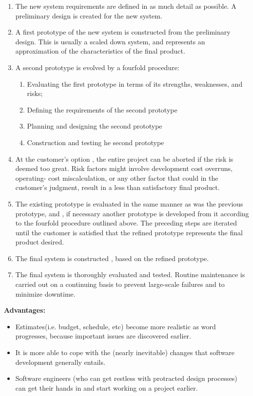 \begin{enumerate}
 \item The new system requirements are defined in as much detail as possible. A preliminary design is created for the new system. 
 \item A first prototype of the new system is constructed from the preliminary design. This is usually a scaled down system, 
and represents an approximation of the characteristics of the final product. 
 \item A second prototype is evolved by a fourfold procedure:
 \begin{enumerate}
  \item Evaluating the first prototype in terms of its strengths, weaknesses, and risks;
  \item Defining the requirements of the second prototype
  \item Planning and designing the second prototype 
  \item Construction and testing he second prototype 
 \end{enumerate}
 \item At the customer's option , the entire project can be aborted if the risk is deemed too great. Risk factors might 
involve development cost overruns, operating- cost miscalculation, or any other factor that could in the customer's judgment, 
result in a less than satisfactory final product.
 \item The existing prototype is evaluated in the same manner as was the previous prototype, and , if necessary another prototype 
is developed from it according to the fourfold procedure outlined above. The preceding steps are iterated until the customer is 
satisfied that the refined prototype represents the final product desired. 
 \item The final system is constructed , based on the refined prototype. 
 \item The final system is thoroughly evaluated and tested. Routine maintenance is carried out on a continuing basis to prevent 
large-scale failures and to minimize downtime.
\end{enumerate}
\textbf{Advantages:}
\begin{itemize}
 \item Estimates(i.e. budget, schedule, etc) become more realistic as word progresses, because important issues are discovered earlier. 
 \item It is more able to cope with the (nearly inevitable) changes that software development generally entails. 
 \item Software engineers (who can get restless with protracted design processes) can get their hands in and start working 
on a project earlier.
\end{itemize}
\newpage
